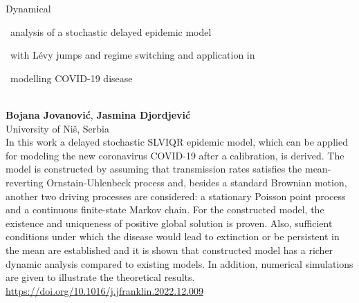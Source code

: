 \documentclass[12pt,a4paper]{article}
\newcommand{\ZAbst}{\rule[-1ex]{0pt}{2ex}\ } %
\begin{document}
\bigskip \bigskip  %

\noindent
{\Large Dynamical \ZAbst analysis of a stochastic delayed epidemic model\ZAbst with Lévy jumps and regime switching and application in\ZAbst modelling COVID-19 disease}\\[1ex]
{\large 
\textbf{Bojana Jovanović}, \textbf{Jasmina Djordjević}\\[1ex] University of Niš, Serbia}\\[2ex]
In this work a delayed stochastic SLVIQR epidemic model, which can be applied for modeling the new coronavirus COVID-19 after a calibration, is derived. The model is constructed by assuming that transmission rates satisfies the mean-reverting Ornstain-Uhlenbeck process and, besides a standard Brownian motion, another two driving processes are considered: a stationary Poisson point process and a continuous finite-state Markov chain. For the constructed model, the existence and uniqueness of positive global solution is proven. Also, sufficient conditions under which the disease would lead to extinction or be persistent in the mean are established and it is shown that constructed model has a richer dynamic analysis compared to existing models. In addition, numerical simulations are given to illustrate the theoretical results.  \\
\url{https://doi.org/10.1016/j.jfranklin.2022.12.009}




\bigskip \bigskip  %
\end{document}
